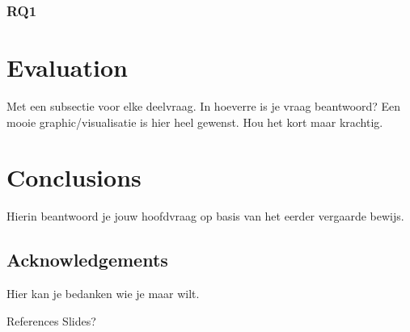 \subsubsection{RQ1}

\section{Evaluation}
Met een subsectie voor elke deelvraag.
In hoeverre is je vraag beantwoord?
Een mooie graphic/visualisatie is hier heel gewenst. Hou het kort maar krachtig.

\section{Conclusions}
Hierin beantwoord je jouw hoofdvraag op basis van het eerder vergaarde bewijs.

\subsection{Acknowledgements}
Hier kan je bedanken wie je maar wilt.

References
Slides?

